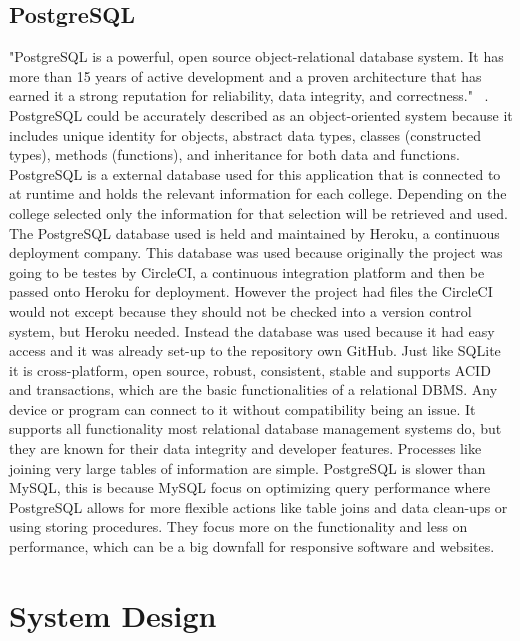 \section{PostgreSQL}
"PostgreSQL is a powerful, open source object-relational database system. It has more than 15 years of active development and a proven architecture that has earned it a strong reputation for reliability, data integrity, and correctness." ~\cite{postgres}. PostgreSQL could be accurately described as an object-oriented system because it includes unique identity for objects, abstract data types, classes (constructed types), methods (functions), and inheritance for both data and functions. PostgreSQL is a external database used for this application that is connected to at runtime and holds the relevant information for each college. Depending on the college selected only the information for that selection will be retrieved and used. The PostgreSQL database used is held and maintained by Heroku, a continuous deployment company. This database was used because originally the project was going to be testes by CircleCI, a continuous integration platform and then be passed onto Heroku for deployment. However the project had files the CircleCI would not except because they should not be checked into a version control system, but Heroku needed. Instead the database was used because it had easy access and it was already set-up to the repository own GitHub. Just like SQLite it is cross-platform, open source, robust, consistent, stable and supports ACID and transactions, which are the basic functionalities of a relational DBMS. Any device or program can connect to it without compatibility being an issue. It supports all functionality most relational database management systems do, but they are known for their data integrity and developer features. Processes like joining very large tables of information are simple. PostgreSQL is slower than MySQL, this is because MySQL focus on optimizing query performance where PostgreSQL allows for more flexible actions like table joins and data clean-ups or using storing procedures. They focus more on the functionality and less on performance, which can be a big downfall for responsive software and websites.

\chapter{System Design}

